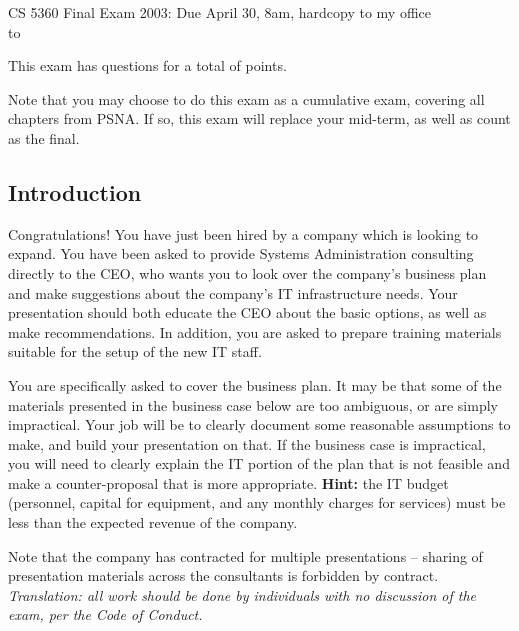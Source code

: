 \documentclass{exam}
\begin{document}
{\large CS 5360 Final Exam 2003: Due April 30, 8am, hardcopy to my office}\\
\hbox to \textwidth{\large Name:\enspace\hrulefill}
\vspace{0.1in}

This exam has \numquestions{} questions for a total of \numpoints{} points.

Note that you may choose to do this exam as a cumulative exam, covering
all chapters from PSNA.  If so, this exam will replace your mid-term, as well
as count as the final.

\begin{questions}

\question[100]

\section*{Introduction}

Congratulations!  You have just been hired by a company which is looking
to expand.  You have been asked to provide Systems Administration
consulting directly to the CEO, who wants you to look over the company's
business plan and make suggestions about the company's IT infrastructure
needs.  Your presentation should both educate the CEO about the basic
options, as well as make recommendations.  In addition, you are asked 
to prepare training materials suitable for the setup of the new IT staff.

You are specifically asked to cover the business plan.  It may be that some
of the materials presented in the business case below are too ambiguous, or 
are simply impractical.  Your job will be to clearly document some reasonable
assumptions to make, and build your presentation on that.  If the business
case is impractical, you will need to clearly explain the IT portion of
the plan that is not feasible and make a counter-proposal that is
more appropriate.  {\bf Hint:} the IT budget (personnel, capital for 
equipment, and any monthly charges for services) must be less than the
expected revenue of the company.  

Note that the company has contracted for multiple presentations -- sharing
of presentation materials across the consultants is forbidden by contract.
\emph{Translation: all work should be done by individuals with no discussion
of the exam, per the Code of Conduct.}


\end{questions}
\end{document}
